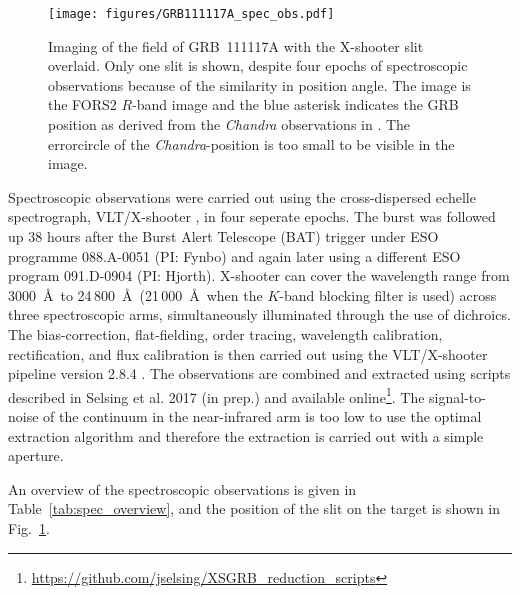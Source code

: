 \documentclass{aa}    %
\begin{document}
\begin{figure}
	\centering
	\texttt{[image: figures/GRB111117A\_spec\_obs.pdf]}
	\caption{Imaging of the field of GRB~111117A with the X-shooter slit overlaid. Only one slit is shown, despite four epochs of spectroscopic observations because of the similarity in position angle. The image is the FORS2 $R$-band image and%
	the blue asterisk indicates the GRB position as derived from the \emph{Chandra} observations in \citet{Sakamoto2013}. The errorcircle of the \emph{Chandra}-position is too small to be visible in the image.}
	\label{fig:spec_setup}
\end{figure}


Spectroscopic observations were carried out using the cross-dispersed echelle
spectrograph, VLT/X-shooter \citep{Vernet2011}, in four seperate epochs. The
burst was followed up 38 hours after the Burst Alert Telescope (BAT) trigger
under ESO programme 088.A-0051 (PI: Fynbo) and again later using a different ESO
program 091.D-0904 (PI: Hjorth). X-shooter can cover the wavelength range from
3000~\AA~to 24\,800~\AA~(21\,000~\AA~when the $K$-band blocking filter is used) across
three spectroscopic arms, simultaneously illuminated through the use of
dichroics. The bias-correction, flat-fielding, order tracing, wavelength
calibration, rectification, and flux calibration is then carried out using the
VLT/X-shooter pipeline version 2.8.4 \citep{Modigliani2010}. 
The observations are combined and extracted using scripts described in Selsing
et al. 2017 (in prep.) and available
online\footnote{\url{https://github.com/jselsing/XSGRB_reduction_scripts}}. The
signal-to-noise of the continuum in the near-infrared arm is too low to use the
optimal extraction algorithm \citep{Horne1986} and therefore the extraction is
carried out with a simple aperture.

An overview of the spectroscopic observations is given in Table~\ref{tab:spec_overview}, and the position of the slit on the target is shown in Fig.~\ref{fig:spec_setup}.

\end{document}
